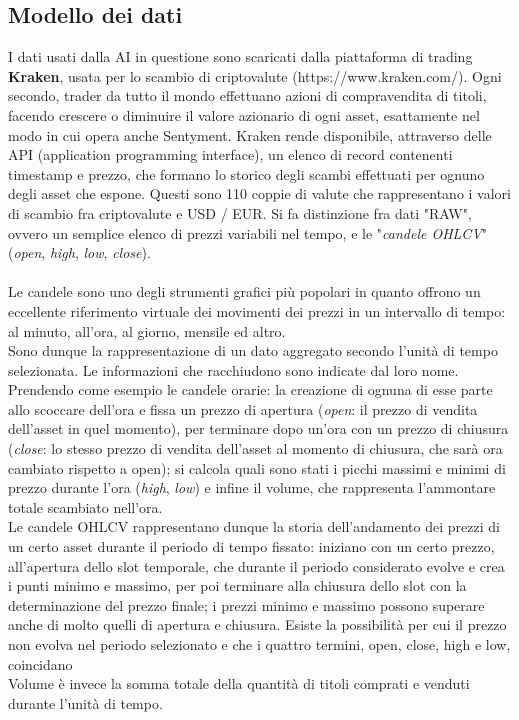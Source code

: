 \documentclass{article}
\numberwithin{equation}{section}
\begin{document}
	\subsection{Modello dei dati}
		I dati usati dalla AI in questione sono scaricati dalla piattaforma di trading \textbf{Kraken}, usata per lo scambio di criptovalute (https://www.kraken.com/). Ogni secondo, trader da tutto il mondo effettuano azioni di compravendita di titoli, facendo crescere o diminuire il valore azionario di ogni asset, esattamente nel modo in cui opera anche Sentyment. Kraken rende disponibile, attraverso delle API (application programming interface), un elenco di record contenenti timestamp e prezzo, che formano lo storico degli scambi effettuati per ognuno degli asset che espone. Questi sono 110 coppie di valute che rappresentano i valori di scambio fra criptovalute e USD / EUR. Si fa distinzione fra dati "RAW", ovvero un semplice elenco di prezzi variabili nel tempo, e le "\textit{candele OHLCV}" (\textit{open}, \textit{high}, \textit{low}, \textit{close}).\\~\\ Le candele sono uno degli strumenti grafici più popolari in quanto offrono un eccellente riferimento virtuale dei movimenti dei prezzi in un intervallo di tempo: al minuto, all'ora, al giorno, mensile ed altro.\\
		Sono dunque la rappresentazione di un dato aggregato secondo l'unità di tempo selezionata. Le informazioni che racchiudono sono indicate dal loro nome. Prendendo come esempio le candele orarie: la creazione di ognuna di esse parte allo scoccare dell'ora e fissa un prezzo di apertura (\textit{open}: il prezzo di vendita dell'asset in quel momento), per terminare dopo un'ora con un prezzo di chiusura (\textit{close}: lo stesso prezzo di vendita dell'asset al momento di chiusura, che sarà ora cambiato rispetto a open); si calcola quali sono stati i picchi massimi e minimi di prezzo durante l'ora (\textit{high}, \textit{low}) e infine il volume, che rappresenta l'ammontare totale scambiato nell'ora.\\
		Le candele OHLCV rappresentano dunque la storia dell'andamento dei prezzi di un certo asset durante il periodo di tempo fissato: iniziano con un certo prezzo, all'apertura dello slot temporale, che durante il periodo considerato evolve e crea i punti minimo e massimo, per poi terminare alla chiusura dello slot con la determinazione del prezzo finale; i prezzi minimo e massimo possono superare anche di molto quelli di apertura e chiusura. Esiste la possibilità per cui il prezzo non evolva nel periodo selezionato e che i quattro termini, open, close, high e low, coincidano\\ Volume è invece la somma totale della quantità di titoli comprati e venduti durante l'unità di tempo.
		\\~\\
		
\end{document}
